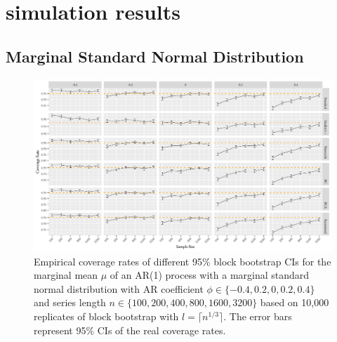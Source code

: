 \documentclass[10pt]{article}
\begin{document}
\section*{simulation results}
\label{sec:simres}


\subsection*{Marginal Standard Normal Distribution}

\begin{figure}[tbp]
  \centering
  \includegraphics[width=\textwidth]{figures/plot_norm_mu_1}
  \caption{Empirical coverage rates of different 95\% block bootstrap CIs for
    the marginal mean $\mu$ of an AR(1) process with a marginal standard 
    normal distribution with AR coefficient
    $\phi \in \{-0.4, 0.2, 0, 0.2, 0.4\}$ and series length
    $n \in \{100, 200, 400, 800, 1600, 3200\}$ based on 10,000 replicates of
    block bootstrap with $l = \lceil n^{1/3} \rceil$. The
    error bars represent 95\% CIs of the real coverage rates.}
  \label{fig:mu1}
\end{figure}
\end{document}
